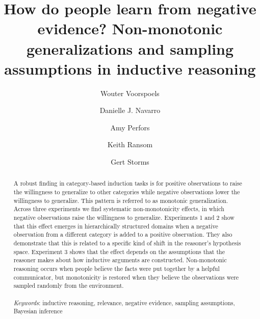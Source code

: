 \documentclass[authoryear,11pt]{elsarticle}
\begin{document}
\begin{frontmatter}

\title{How do people learn from negative evidence? Non-monotonic generalizations and sampling assumptions in inductive reasoning}

\journal{}

\author[leuven]{Wouter Voorspoels}

\author[adelaide]{Danielle J. Navarro}

\author[adelaide]{Amy Perfors}

\author[adelaide]{Keith Ransom}

\author[leuven]{Gert Storms}



\address[leuven]{Department of Psychology, University of Leuven, Belgium}
\address[adelaide]{School of Psychology, University of Adelaide, Australia}



	\begin{abstract}
A robust finding in category-based induction tasks is for positive observations to raise the willingness to generalize to other categories while negative observations lower the willingness to generalize. This pattern is referred to as monotonic generalization. Across three experiments we find systematic non-monotonicity effects, in which negative observations raise the willingness to generalize.
Experiments 1 and 2 show that this effect emerges in hierarchically structured domains when a negative observation from a different category is added to a positive observation. They also demonstrate that this is  related to a specific kind of shift in the reasoner's hypothesis space. Experiment 3 shows that the effect depends on the assumptions that the reasoner makes about how inductive arguments are constructed. Non-monotonic reasoning occurs when people believe the facts were put together by a helpful communicator, but monotonicity is restored when they believe the observations were sampled randomly from the environment.\\ \\
	{\it Keywords}: inductive reasoning, relevance, negative evidence, sampling assumptions, Bayesian inference
	\end{abstract}

\end{frontmatter}
\end{document}
